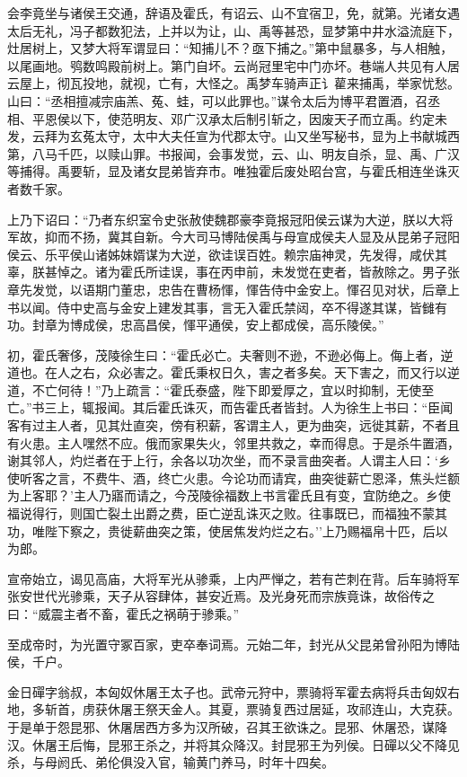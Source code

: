 \documentclass[]{article}
\begin{document}
会李竟坐与诸侯王交通，辞语及霍氏，有诏云、山不宜宿卫，免，就第。光诸女遇太后无礼，冯子都数犯法，上并以为让，山、禹等甚恐，显梦第中井水溢流庭下，灶居树上，又梦大将军谓显曰：``知捕儿不？亟下捕之。''第中鼠暴多，与人相触，以尾画地。鸮数鸣殿前树上。第门自坏。云尚冠里宅中门亦坏。巷端人共见有人居云屋上，彻瓦投地，就视，亡有，大怪之。禹梦车骑声正讠雚来捕禹，举家忧愁。山曰：``丞相擅减宗庙羔、菟、蛙，可以此罪也。''谋令太后为博平君置酒，召丞相、平恩侯以下，使范明友、邓广汉承太后制引斩之，因废天子而立禹。约定未发，云拜为玄菟太守，太中大夫任宣为代郡太守。山又坐写秘书，显为上书献城西第，八马千匹，以赎山罪。书报闻，会事发觉，云、山、明友自杀，显、禹、广汉等捕得。禹要斩，显及诸女昆弟皆弃市。唯独霍后废处昭台宫，与霍氏相连坐诛灭者数千家。

上乃下诏曰：``乃者东织室令史张赦使魏郡豪李竟报冠阳侯云谋为大逆，朕以大将军故，抑而不扬，冀其自新。今大司马博陆侯禹与母宣成侯夫人显及从昆弟子冠阳侯云、乐平侯山诸姊妹婿谋为大逆，欲诖误百姓。赖宗庙神灵，先发得，咸伏其辜，朕甚悼之。诸为霍氏所诖误，事在丙申前，未发觉在吏者，皆赦除之。男子张章先发觉，以语期门董忠，忠告在曹杨惲，惲告侍中金安上。惲召见对状，后章上书以闻。侍中史高与金安上建发其事，言无入霍氏禁闼，卒不得遂其谋，皆雠有功。封章为博成侯，忠高昌侯，惲平通侯，安上都成侯，高乐陵侯。''

初，霍氏奢侈，茂陵徐生曰：``霍氏必亡。夫奢则不逊，不逊必侮上。侮上者，逆道也。在人之右，众必害之。霍氏秉权日久，害之者多矣。天下害之，而又行以逆道，不亡何待！''乃上疏言：``霍氏泰盛，陛下即爱厚之，宜以时抑制，无使至亡。''书三上，辄报闻。其后霍氏诛灭，而告霍氏者皆封。人为徐生上书曰：``臣闻客有过主人者，见其灶直突，傍有积薪，客谓主人，更为曲突，远徙其薪，不者且有火患。主人嘿然不应。俄而家果失火，邻里共救之，幸而得息。于是杀牛置酒，谢其邻人，灼烂者在于上行，余各以功次坐，而不录言曲突者。人谓主人曰：`乡使听客之言，不费牛、酒，终亡火患。今论功而请宾，曲突徙薪亡恩泽，焦头烂额为上客耶？'主人乃寤而请之，今茂陵徐福数上书言霍氏且有变，宜防绝之。乡使福说得行，则国亡裂土出爵之费，臣亡逆乱诛灭之败。往事既已，而福独不蒙其功，唯陛下察之，贵徙薪曲突之策，使居焦发灼烂之右。''上乃赐福帛十匹，后以为郎。

宣帝始立，谒见高庙，大将军光从骖乘，上内严惮之，若有芒刺在背。后车骑将军张安世代光骖乘，天子从容肆体，甚安近焉。及光身死而宗族竟诛，故俗传之曰：``威震主者不畜，霍氏之祸萌于骖乘。''

至成帝时，为光置守冢百家，吏卒奉词焉。元始二年，封光从父昆弟曾孙阳为博陆侯，千户。

金日磾字翁叔，本匈奴休屠王太子也。武帝元狩中，票骑将军霍去病将兵击匈奴右地，多斩首，虏获休屠王祭天金人。其夏，票骑复西过居延，攻祁连山，大克获。于是单于怨昆邪、休屠居西方多为汉所破，召其王欲诛之。昆邪、休屠恐，谋降汉。休屠王后悔，昆邪王杀之，并将其众降汉。封昆邪王为列侯。日磾以父不降见杀，与母阏氏、弟伦俱没入官，输黄门养马，时年十四矣。
\end{document}

